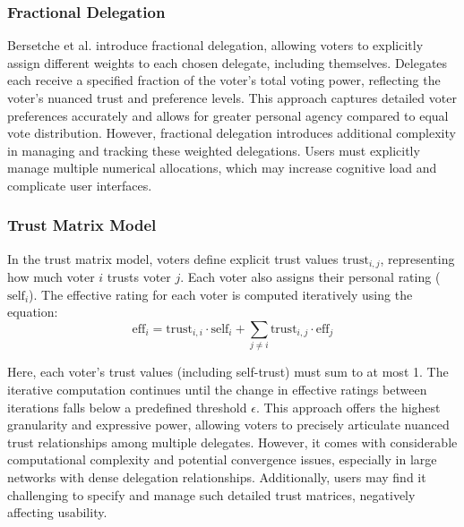 \subsubsection*{Fractional Delegation~\citep{bersetche2024}}
Bersetche et al. introduce fractional delegation, allowing voters to explicitly assign different weights to each chosen delegate, including themselves. Delegates each receive a specified fraction of the voter's total voting power, reflecting the voter's nuanced trust and preference levels. This approach captures detailed voter preferences accurately and allows for greater personal agency compared to equal vote distribution. However, fractional delegation introduces additional complexity in managing and tracking these weighted delegations. Users must explicitly manage multiple numerical allocations, which may increase cognitive load and complicate user interfaces.

\subsubsection*{Trust Matrix Model}
In the trust matrix model, voters define explicit trust values \( \text{trust}_{i,j} \), representing how much voter \( i \) trusts voter \( j \). Each voter also assigns their personal rating (\( \text{self}_i \)). The effective rating for each voter is computed iteratively using the equation:
\[
\text{eff}_i = \text{trust}_{i,i} \cdot \text{self}_i + \sum_{j \neq i}\text{trust}_{i,j} \cdot \text{eff}_j
\]

Here, each voter's trust values (including self-trust) must sum to at most 1. The iterative computation continues until the change in effective ratings between iterations falls below a predefined threshold \( \epsilon \). This approach offers the highest granularity and expressive power, allowing voters to precisely articulate nuanced trust relationships among multiple delegates. However, it comes with considerable computational complexity and potential convergence issues, especially in large networks with dense delegation relationships. Additionally, users may find it challenging to specify and manage such detailed trust matrices, negatively affecting usability.

